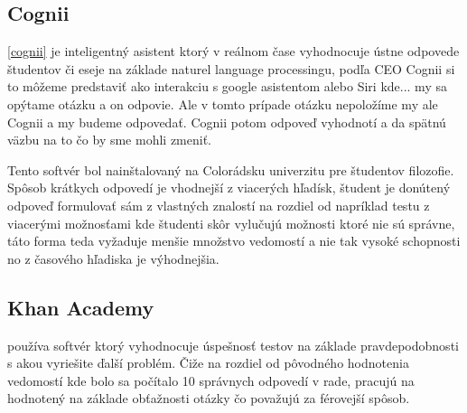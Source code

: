 \documentclass[10pt,oneside,slovak,a4paper]{article}
\begin{document}

\subsection{Cognii}
\ref{cognii}
je inteligentný asistent ktorý v reálnom čase vyhodnocuje ústne odpovede študentov či eseje na základe naturel language processingu, podľa CEO Cognii si to môžeme predstaviť ako interakciu s google asistentom alebo Siri kde... my sa opýtame otázku a on odpovie. Ale v tomto prípade otázku nepoložíme my ale Cognii a my budeme odpovedať. Cognii potom odpoveď vyhodnotí a da spätnú väzbu na to čo by sme mohli zmeniť. 

Tento softvér bol nainštalovaný na Colorádsku univerzitu pre študentov filozofie. 
Spôsob krátkych odpovedí je vhodnejší z viacerých hľadísk, študent je donútený odpoveď formulovať sám z vlastných znalostí na rozdiel od napríklad testu z viacerými možnosťami kde študenti skôr vylučujú možnosti ktoré nie sú správne, táto forma  teda vyžaduje menšie množstvo vedomostí a nie tak vysoké schopnosti no z časového hľadiska je výhodnejšia.


\subsection{Khan Academy}
používa softvér ktorý vyhodnocuje úspešnosť testov na základe pravdepodobnosti s akou vyriešite ďalší problém.  Čiže na rozdiel od pôvodného hodnotenia vedomostí kde bolo sa počítalo 10 správnych odpovedí v rade, pracujú na hodnotený na základe obťažnosti otázky čo považujú za férovejší spôsob.\label{khan_academy_learning}
\end{document}
